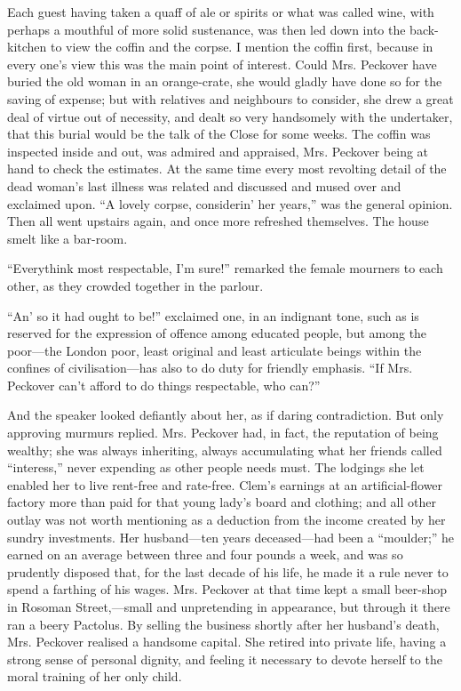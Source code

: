 Each guest having taken a quaff of ale or spirits or what was called
wine, with perhaps a mouthful of more solid sustenance, was then led
down into the back-kitchen to view the coffin and the corpse. I mention
the coffin first, because in every one's view this was the main point of
interest. Could Mrs. Peckover have buried the old woman
{\protect\hypertarget{98}{}{}}in an orange-crate, she would gladly have
done so for the saving of expense; but with relatives and neighbours to
consider, she drew a great deal of virtue out of necessity, and dealt so
very handsomely with the undertaker, that this burial would be the talk
of the Close for some weeks. The coffin was inspected inside and out,
was admired and appraised, Mrs. Peckover being at hand to check the
estimates. At the same time every most revolting detail of the dead
woman's last illness was related and discussed and mused over and
exclaimed upon. ``A lovely corpse, considerin' her years,'' was the
general opinion. Then all went upstairs again, and once more refreshed
themselves. The house smelt like a bar-room.

``Everythink most respectable, I'm sure!'' remarked the female mourners
to each other, as they crowded together in the parlour.

``An' so it had ought to be!'' exclaimed one, in an indignant tone, such
as is reserved for the expression of offence among educated people, but
among the poor---the London {\protect\hypertarget{99}{}{}}poor, least
original and least articulate beings within the confines of
civilisation---has also to do duty for friendly emphasis. ``If Mrs.
Peckover can't afford to do things respectable, who can?''

And the speaker looked defiantly about her, as if daring contradiction.
But only approving murmurs replied. Mrs. Peckover had, in fact, the
reputation of being wealthy; she was always inheriting, always
accumulating what her friends called ``interess,'' never expending as
other people needs must. The lodgings she let enabled her to live
rent-free and rate-free. Clem's earnings at an artificial-flower factory
more than paid for that young lady's board and clothing; and all other
outlay was not worth mentioning as a deduction from the income created
by her sundry investments. Her husband---ten years deceased---had been a
``moulder;'' he earned on an average between three and four pounds a
week, and was so prudently disposed that, for the last decade of his
life, he made it a rule never to spend a farthing of
{\protect\hypertarget{100}{}{}}his wages. Mrs. Peckover at that time
kept a small beer-shop in Rosoman Street,---small and unpretending in
appearance, but through it there ran a beery Pactolus. By selling the
business shortly after her husband's death, Mrs. Peckover realised a
handsome capital. She retired into private life, having a strong sense
of personal dignity, and feeling it necessary to devote herself to the
moral training of her only child.

